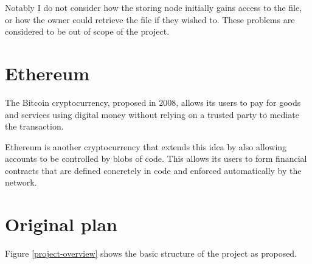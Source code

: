 \documentclass[12pt,a4paper,twoside,openright]{report}
\begin{document}
Notably I do not consider how the storing node initially gains access to the file, or how the owner could retrieve the file if they wished to.
These problems are considered to be out of scope of the project.


\section{Ethereum}

The Bitcoin cryptocurrency, proposed in 2008, allows its users to pay for goods and services using digital money
without relying on a trusted party to mediate the transaction.

Ethereum is another cryptocurrency that extends this idea by also allowing accounts to be controlled by blobs of code.
This allows its users to form financial contracts that are defined concretely in code and enforced automatically by the network.


\section{Original plan}

Figure \ref{project-overview} shows the basic structure of the project as proposed.
\end{document}
